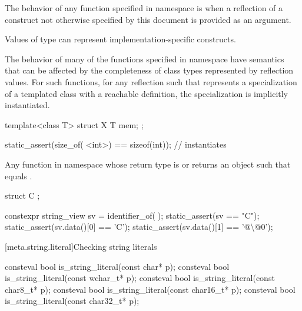 \pnum
The behavior of any function specified in namespace  is
when a reflection of a construct not otherwise specified by this document
is provided as an argument.
\begin{note}
Values of type 
can represent implementation-specific constructs.
\end{note}
\begin{note}
The behavior of many of the functions specified in namespace 
have semantics that can be affected by
the completeness of class types represented by reflection values.
For such functions,
for any reflection  such that 
represents a specialization of a templated class with a reachable definition,
the specialization is implicitly instantiated.
\begin{example}
\begin{codeblock}
template<class T>
struct X {
  T mem;
};

static_assert(size_of(^^X<int>) == sizeof(int));    // instantiates 
\end{codeblock}
\end{example}
\end{note}

\pnum
Any function in namespace 
whose return type is  or 
returns an object  such that
 equals .
\begin{example}
\begin{codeblock}
struct C { };

constexpr string_view sv = identifier_of(^^C);
static_assert(sv == "C");
static_assert(sv.data()[0] == 'C');
static_assert(sv.data()[1] == '@\textbackslash{}@0');
\end{codeblock}
\end{example}

[meta.string.literal]{Checking string literals}

%
\begin{itemdecl}
consteval bool is_string_literal(const char* p);
consteval bool is_string_literal(const wchar_t* p);
consteval bool is_string_literal(const char8_t* p);
consteval bool is_string_literal(const char16_t* p);
consteval bool is_string_literal(const char32_t* p);
\end{itemdecl}

